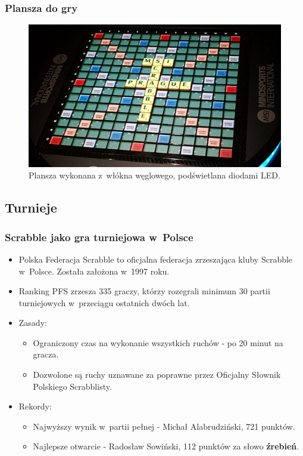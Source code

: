 \documentclass[10pt,a4paper]{beamer}
\begin{document}
\begin{frame}
	\frametitle{Plansza do gry}

	\begin{figure}
		\centering
		\includegraphics[scale=0.17]{graphics/board.jpg}
		\caption{Plansza wykonana z~włókna węglowego, podświetlana diodami LED.}
	\end{figure}
\end{frame}

\subsection{Turnieje}

\begin{frame}
	\frametitle{Scrabble jako gra turniejowa w~Polsce}

	\begin{itemize}
		\item Polska Federacja Scrabble to oficjalna federacja zrzeszająca kluby Scrabble w~Polsce. Została założona w~1997 roku.
		\item Ranking PFS zrzesza 335 graczy, którzy rozegrali minimum 30 partii turniejowych w~przeciągu ostatnich dwóch lat.
		\item Zasady:
			\begin{itemize}
				\item Ograniczony czas na wykonanie wszystkich ruchów - po 20 minut na gracza.
				\item Dozwolone są ruchy uznawane za poprawne przez Oficjalny Słownik Polskiego Scrabblisty.
			\end{itemize}
		\item Rekordy:
			\begin{itemize}
				\item Najwyższy wynik w~partii pełnej - Michał Alabrudziński, 721 punktów.
				\item Najlepsze otwarcie - Radosław Sowiński, 112 punktów za słowo \textbf{źrebień}.
			\end{itemize}
	\end{itemize}
	
\end{frame}
\end{document}
